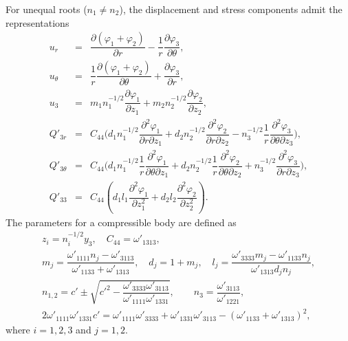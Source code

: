 For unequal roots ($n_1\neq n_2$), the displacement and stress components admit the representations
\begin{equation}
	\label{BogdanovGuzEq14}
	\begin{array}{rcl}
		u_r
		&=&
		\dfrac{\partial (\varphi_1+\varphi_2)}{\partial r}
		-
		\dfrac{1}{r}
		\dfrac{\partial \varphi_3}{\partial \theta},
		\\[6pt]
		
		u_\theta
		&=&
		\dfrac{1}{r}
		\dfrac{\partial (\varphi_1+\varphi_2)}{\partial \theta}
		+
		\dfrac{\partial \varphi_3}{\partial r},
		\\[6pt]
		
		u_3
		&=&
		m_1 n_1^{-1/2}
		\dfrac{\partial \varphi_1}{\partial z_1}
		+
		m_2 n_2^{-1/2}
		\dfrac{\partial \varphi_2}{\partial z_2},
		\\[8pt]
		
		Q'_{3r}
		&=&
		C_{44}
		\Bigg(
		d_1 n_1^{-1/2}
		\dfrac{\partial^2 \varphi_1}{\partial r \partial z_1}
		+
		d_2 n_2^{-1/2}
		\dfrac{\partial^2 \varphi_2}{\partial r \partial z_2}
		-
		n_3^{-1/2}
		\dfrac{1}{r}
		\dfrac{\partial^2 \varphi_3}{\partial \theta \partial z_3}
		\Bigg),
		\\[6pt]
		
		Q'_{3\theta}
		&=&
		C_{44}
		\Bigg(
		d_1 n_1^{-1/2}
		\dfrac{1}{r}
		\dfrac{\partial^2 \varphi_1}{\partial \theta \partial z_1}
		+
		d_2 n_2^{-1/2}
		\dfrac{1}{r}
		\dfrac{\partial^2 \varphi_2}{\partial \theta \partial z_2}
		+
		n_3^{-1/2}
		\dfrac{\partial^2 \varphi_3}{\partial r \partial z_3}
		\Bigg),
		\\[6pt]
		
		Q'_{33}
		&=&
		C_{44}
		\left(
		d_1 l_1
		\dfrac{\partial^2 \varphi_1}{\partial z_1^2}
		+
		d_2 l_2
		\dfrac{\partial^2 \varphi_2}{\partial z_2^2}
		\right).
	\end{array}
\end{equation}
The parameters for a compressible body are defined as
\begin{equation}
	\label{BogdanovGuzEq15}
	\begin{array}{l}
		z_i = n_i^{-1/2} y_3, \quad
		C_{44} = \omega'_{1313}, \\[4pt]	
		m_j =
		\dfrac{\omega'_{1111} n_j - \omega'_{3113}}
		{\omega'_{1133} + \omega'_{1313}}, \quad
		d_j = 1 + m_j, \quad		
		l_j =
		\dfrac{\omega'_{3333} m_j - \omega'_{1133} n_j}
		{\omega'_{1313} d_j n_j}, 
		\\[6pt]
		n_{1,2} =
		c' \pm
		\sqrt{
			c'^2 -
			\dfrac{\omega'_{3333}\omega'_{3113}}
			{\omega'_{1111}\omega'_{1331}}
		}, \qquad
		n_3 =
		\dfrac{\omega'_{3113}}{\omega'_{1221}}, \\[4pt]
		
		2\omega'_{1111}\omega'_{1331}c'
		=
		\omega'_{1111}\omega'_{3333}
		+
		\omega'_{1331}\omega'_{3113}
		-
		(\omega'_{1133}+\omega'_{1313})^2,
	\end{array}
\end{equation}
where $ i=1,2,3$ and $j=1,2$. 

